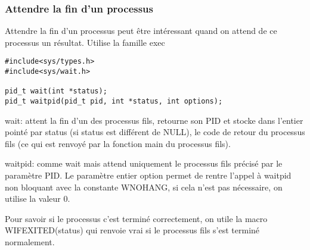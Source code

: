 \documentclass[a4paper]{article}
\begin{document}
\subsubsection{Attendre la fin d'un processus}
Attendre la fin d'un processus peut être intéressant quand on attend de ce processus un résultat.\newline
Utilise la famille exec\newline
\begin{lstlisting}
#include<sys/types.h>
#include<sys/wait.h>

pid_t wait(int *status);
pid_t waitpid(pid_t pid, int *status, int options);
\end{lstlisting}
wait: attent la fin d'un des processus fils, retourne son PID et stocke dans l'entier pointé par status (si status est différent de NULL), le code de retour du processus fils (ce qui est renvoyé par la  fonction main du processus fils).\par{}
waitpid: comme wait mais attend uniquement le processus fils précisé par le paramètre PID.  Le paramètre entier \guillemotleft{}option\guillemotright{} permet de rentre l'appel à waitpid non bloquant avec la constante WNOHANG, si cela n'est pas nécessaire, on utilise la valeur 0.
\par{}
Pour savoir si le processus c'est terminé correctement, on utile la macro WIFEXITED(status) qui renvoie vrai si le processus fils s'est terminé normalement.\newline
\end{document}
